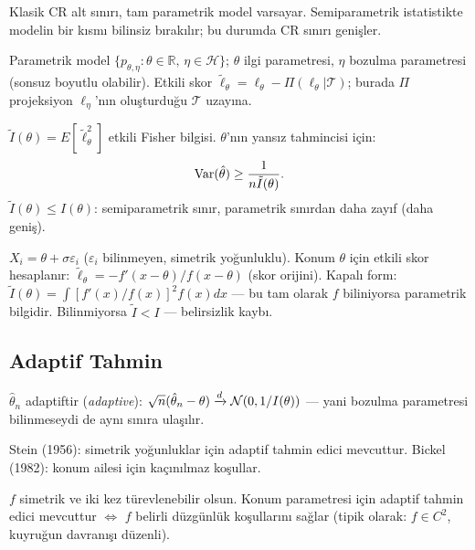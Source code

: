 Klasik CR alt sınırı, tam parametrik model varsayar. Semiparametrik istatistikte modelin bir kısmı bilinsiz bırakılır; bu durumda CR sınırı genişler.

\begin{tanim}\label{def:etkili_skor}
Parametrik model $\{p_{\theta,\eta}:\theta\in\mathbb{R},\,\eta\in\mathcal{H}\}$; $\theta$ ilgi parametresi, $\eta$ bozulma parametresi (sonsuz boyutlu olabilir). Etkili skor $\tilde\ell_\theta = \ell_\theta - \Pi(\ell_\theta|\mathcal{T})$; burada $\Pi$ projeksiyon $\ell_\eta$'nın oluşturduğu $\mathcal{T}$ uzayına.
\end{tanim}

\begin{teorem}\label{thm:semi_cr}
$\tilde I(\theta)=E[\tilde\ell_\theta^2]$ etkili Fisher bilgisi. $\theta$'nın yansız tahmincisi için:
\[
  \operatorname{Var}(\hat\theta) \geq \frac{1}{n\tilde I(\theta)}.
\]
$\tilde I(\theta)\leq I(\theta)$: semiparametrik sınır, parametrik sınırdan daha zayıf (daha geniş).
\end{teorem}

\begin{ornek}\label{ex:konum_olcek}
$X_i=\theta+\sigma\varepsilon_i$ ($\varepsilon_i$ bilinmeyen, simetrik yoğunluklu). Konum $\theta$ için etkili skor hesaplanır: $\tilde\ell_\theta=-f'(x-\theta)/f(x-\theta)$ (skor orijini). Kapalı form: $\tilde I(\theta)=\int[f'(x)/f(x)]^2f(x)dx$ --- bu tam olarak $f$ biliniyorsa parametrik bilgidir. Bilinmiyorsa $\tilde I<I$ --- belirsizlik kaybı.
\end{ornek}

\subsection{Adaptif Tahmin}

\begin{tanim}\label{def:adaptif}
$\hat\theta_n$ adaptiftir (\emph{adaptive}): $\sqrt{n}(\hat\theta_n-\theta)\xrightarrow{d}\mathcal{N}(0,1/I(\theta))$ --- yani bozulma parametresi bilinmeseydi de aynı sınıra ulaşılır.
\end{tanim}

Stein (1956): simetrik yoğunluklar için adaptif tahmin edici mevcuttur. Bickel (1982): konum ailesi için kaçınılmaz koşullar.

\begin{teorem}\label{thm:adaptivite}
$f$ simetrik ve iki kez türevlenebilir olsun. Konum parametresi için adaptif tahmin edici mevcuttur $\iff$ $f$ belirli düzgünlük koşullarını sağlar (tipik olarak: $f\in C^2$, kuyruğun davranışı düzenli).
\end{teorem}

